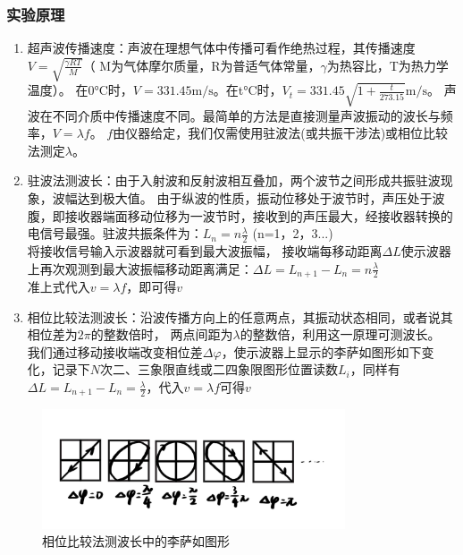 \documentclass{../template/Preport}
\begin{document}
\subsubsection{实验原理}
\begin{enumerate}
	\item 超声波传播速度：声波在理想气体中传播可看作绝热过程，其传播速度$V=\sqrt{\frac{\gamma RT}{M}}$（
	      M为气体摩尔质量，R为普适气体常量，$\gamma$为热容比，T为热力学温度）。
	      在0$\si{\degreeCelsius}$时，$V=331.45\si{\metre\per\second}$。在t$\si{\degreeCelsius}$时，$V_t = 331.45\sqrt{1+\frac{t}{273.15}}\si{\metre\per\second}$。
	      声波在不同介质中传播速度不同。最简单的方法是直接测量声波振动的波长与频率，$V=\lambda f$。
	      $f$由仪器给定，我们仅需使用驻波法(或共振干涉法)或相位比较法测定$\lambda$。
	\item 驻波法测波长：由于入射波和反射波相互叠加，两个波节之间形成共振驻波现象，波幅达到极大值。
	      由于纵波的性质，振动位移处于波节时，声压处于波腹，即接收器端面移动位移为一波节时，接收到的声压最大，经接收器转换的电信号最强。驻波共振条件为：$L_n = n\frac{\lambda}{2}$ (n=1，2，3...)\\
	      将接收信号输入示波器就可看到最大波振幅，
	      接收端每移动距离$\Delta L$使示波器上再次观测到最大波振幅移动距离满足：$\Delta L = L_{n+1} - L_n = n\frac{\lambda}{2}$\\
	      准上式代入$v=\lambda f$，即可得$v$
	\item 相位比较法测波长：沿波传播方向上的任意两点，其振动状态相同，或者说其相位差为$2\pi$的整数倍时，
	      两点间距为$\lambda$的整数倍，利用这一原理可测波长。
	      我们通过移动接收端改变相位差$\Delta\varphi$，使示波器上显示的李萨如图形如下变化，记录下$N$次二、三象限直线或二四象限图形位置读数$L_i$，同样有$\Delta L = L_{n+1} - L_n = \frac{\lambda}{2}$，代入$v=\lambda f$可得$v$
\end{enumerate}
\begin{figure}[H]
	\centering
	\includegraphics[width=0.8\textwidth]{figures/1.jpg}
	\caption{相位比较法测波长中的李萨如图形}
\end{figure}
\end{document}
